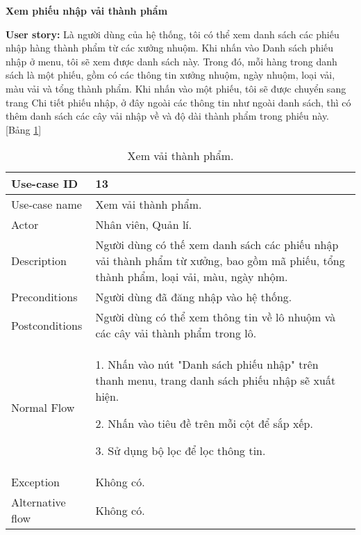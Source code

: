 \textbf{Xem phiếu nhập vải thành phẩm}\par
\textbf{User story:} Là người dùng của hệ thống, tôi có thể xem danh sách các phiếu nhập hàng thành phẩm từ các xưởng nhuộm. Khi nhấn vào Danh sách phiếu nhập ở menu, tôi sẽ xem được danh sách này. Trong đó, mỗi hàng trong danh sách là một phiếu, gồm có các thông tin xưởng nhuộm, ngày nhuộm, loại vải, màu vải và tổng thành phẩm. Khi nhấn vào một phiếu, tôi sẽ được chuyển sang trang Chi tiết phiếu nhập, ở đây ngoài các thông tin như ngoài danh sách, thì có thêm danh sách các cây vải nhập về và độ dài thành phẩm trong phiếu này. [Bảng \ref{bang10}]
\begin{table}[H]
    \centering
    \begin{tabular}{|m{3cm}|m{10cm}|}
    \hline 
        Use-case ID & 13\\ \hline
        Use-case name & Xem vải thành phẩm.\\ \hline
        Actor & Nhân viên, Quản lí.\\ \hline
        Description & Người dùng có thế xem danh sách các phiếu nhập vải thành phẩm từ xưởng, bao gồm mã phiếu, tổng thành phẩm, loại vải, màu, ngày nhộm.\\ \hline
        Preconditions & Người dùng đã đăng nhập vào hệ thống.\\ \hline
        Postconditions & Người dùng có thể xem thông tin về lô nhuộm và các cây vải thành phẩm trong lô.\\ \hline
        Normal Flow & 
        1. Nhấn vào nút "Danh sách phiếu nhập" trên thanh menu, trang danh sách phiếu nhập sẽ xuất hiện.\par
        2. Nhấn vào tiêu đề trên mỗi cột để sắp xếp.\par
        3. Sử dụng bộ lọc để lọc thông tin.
        \\ \hline
        Exception & Không có.\\ \hline
        Alternative flow & Không có.\\ 
    \hline 
    \end{tabular}
    \caption{Xem vải thành phẩm.}
    \label{bang10}
\end{table}


